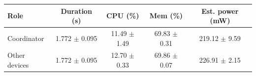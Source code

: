 \begin{tabular}{lcccc}
\hline
\textbf{Role} & \textbf{Duration (s)} & \textbf{CPU (\%)} & \textbf{Mem (\%)} & \textbf{Est. power (mW)} \\
\hline
Coordinator & 1.772 $\pm$ 0.095 & 11.49 $\pm$ 1.49 & 69.83 $\pm$ 0.31 & 219.12 $\pm$ 9.59 \\
Other devices & 1.772 $\pm$ 0.095 & 12.70 $\pm$ 0.33 & 69.86 $\pm$ 0.07 & 226.91 $\pm$ 2.15 \\
\hline
\end{tabular}
